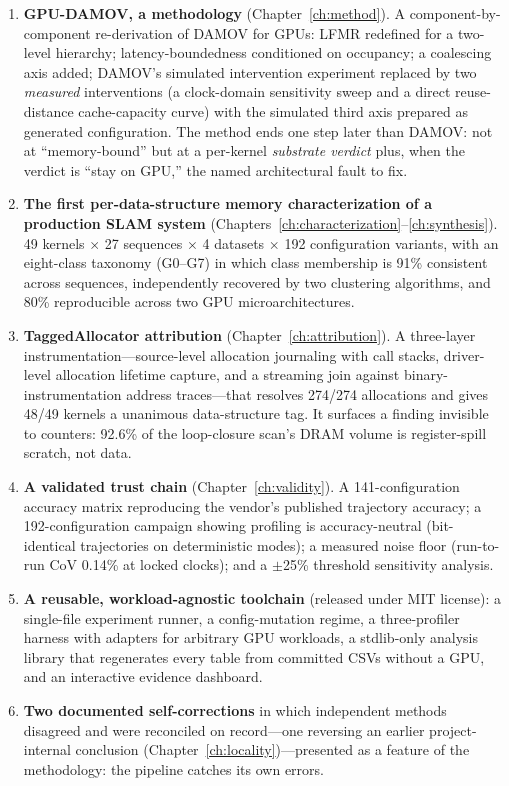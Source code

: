 \begin{enumerate}
\item \textbf{GPU-DAMOV, a methodology} (Chapter~\ref{ch:method}). A
component-by-component re-derivation of DAMOV for GPUs: LFMR redefined for a
two-level hierarchy; latency-boundedness conditioned on occupancy; a
coalescing axis added; DAMOV's simulated intervention experiment replaced by
two \emph{measured} interventions (a clock-domain sensitivity sweep and a
direct reuse-distance cache-capacity curve) with the simulated third axis
prepared as generated configuration. The method ends one step later than
DAMOV: not at ``memory-bound'' but at a per-kernel \emph{substrate verdict}
plus, when the verdict is ``stay on GPU,'' the named architectural fault to
fix.
\item \textbf{The first per-data-structure memory characterization of a
production SLAM system} (Chapters~\ref{ch:characterization}--\ref{ch:synthesis}).
49 kernels $\times$ 27 sequences $\times$ 4 datasets $\times$ 192
configuration variants, with an eight-class taxonomy (G0--G7) in which class
membership is 91\% consistent across sequences, independently recovered by
two clustering algorithms, and 80\% reproducible across two GPU
microarchitectures.
\item \textbf{TaggedAllocator attribution} (Chapter~\ref{ch:attribution}). A
three-layer instrumentation---source-level allocation journaling with call
stacks, driver-level allocation lifetime capture, and a streaming join
against binary-instrumentation address traces---that resolves 274/274
allocations and gives 48/49 kernels a unanimous data-structure tag. It
surfaces a finding invisible to counters: 92.6\% of the loop-closure scan's
DRAM volume is register-spill scratch, not data.
\item \textbf{A validated trust chain} (Chapter~\ref{ch:validity}). A
141-configuration accuracy matrix reproducing the vendor's published
trajectory accuracy; a 192-configuration campaign showing profiling is
accuracy-neutral (bit-identical trajectories on deterministic modes); a
measured noise floor (run-to-run CoV 0.14\% at locked clocks); and a
$\pm$25\% threshold sensitivity analysis.
\item \textbf{A reusable, workload-agnostic toolchain} (released under MIT
license): a single-file experiment runner, a config-mutation regime, a
three-profiler harness with adapters for arbitrary GPU workloads, a
stdlib-only analysis library that regenerates every table from committed
CSVs without a GPU, and an interactive evidence dashboard.
\item \textbf{Two documented self-corrections} in which independent methods
disagreed and were reconciled on record---one reversing an earlier
project-internal conclusion (Chapter~\ref{ch:locality})---presented as a
feature of the methodology: the pipeline catches its own errors.
\end{enumerate}

